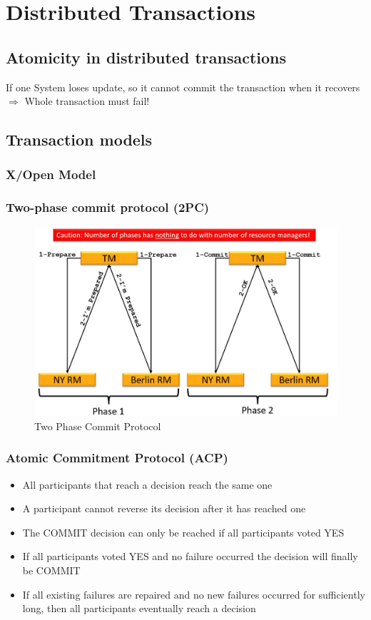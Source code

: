 		
	\newpage	
	\section{Distributed Transactions}
	
		\subsection{Atomicity in distributed transactions}
			If one System loses update, so it cannot commit the transaction when it recovers $ \Rightarrow $ Whole transaction must fail!
		\subsection{Transaction models}
			\subsubsection{X/Open Model}
			
			\subsubsection{Two-phase commit protocol (2PC)}
				\begin{figure}[h!]
					\includegraphics[scale=0.3]{res/two_phase_commit_protocol.jpg}
					\caption{Two Phase Commit Protocol}
				\end{figure}
			
			\subsubsection{Atomic Commitment Protocol (ACP)}
				\begin{itemize}
				 \item All participants that reach a decision reach the same one
				 \item A participant cannot reverse its decision after it has reached one 
				 \item The COMMIT decision can only be reached if all participants voted YES 
				 \item  If all participants voted YES and no failure occurred the decision will finally be COMMIT 
				 \item If all existing failures are repaired and no new failures occurred for sufficiently long, then all participants eventually reach a decision 
			\end{itemize}
			

